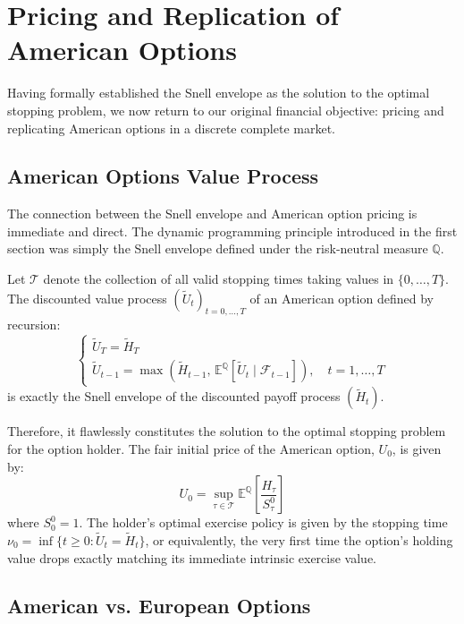 \chapter{Pricing and Replication of American Options}

Having formally established the Snell envelope as the solution to the optimal stopping problem, we now return to our original financial objective: pricing and replicating American options in a discrete complete market.

\section{American Options Value Process}

The connection between the Snell envelope and American option pricing is immediate and direct. The dynamic programming principle introduced in the first section was simply the Snell envelope defined under the risk-neutral measure $\mathbb{Q}$.

\begin{proposition}
Let $\mathcal{T}$ denote the collection of all valid stopping times taking values in $\{0, \dots, T\}$. 
The discounted value process $(\tilde{U}_t)_{t=0, \dots, T}$ of an American option defined by recursion:
$$
\begin{cases}
\tilde{U}_T = \tilde{H}_T \\
\tilde{U}_{t-1} = \max\left( \tilde{H}_{t-1}, \, \mathbb{E}^{\mathbb{Q}}\left[ \tilde{U}_t \mid \mathcal{F}_{t-1} \right] \right), \quad t = 1, \ldots, T
\end{cases}
$$
is exactly the Snell envelope of the discounted payoff process $(\tilde{H}_t)$.

Therefore, it flawlessly constitutes the solution to the optimal stopping problem for the option holder. The fair initial price of the American option, $U_0$, is given by:
$$
U_0 = \sup_{\tau \in \mathcal{T}} \mathbb{E}^{\mathbb{Q}}\left[ \frac{H_\tau}{S_\tau^0} \right]
$$
where $S_0^0 = 1$. The holder's optimal exercise policy is given by the stopping time $\nu_0 = \inf\{t \geq 0 : \tilde{U}_t = \tilde{H}_t\}$, or equivalently, the very first time the option's holding value drops exactly matching its immediate intrinsic exercise value.
\end{proposition}

\section{American vs. European Options}

